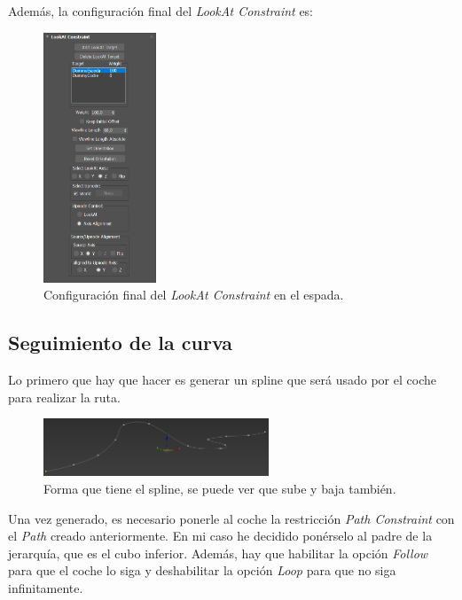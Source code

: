 Además, la configuración final del \textit{LookAt Constraint} es:

\begin{figure}[H]
    \centering
   \includegraphics[width=0.3\textwidth]{imagenes/espada/lookatconfig.png}
   \caption{Configuración final del \textit{LookAt Constraint} en el espada.}
\end{figure}

\subsection{Seguimiento de la curva}

Lo primero que hay que hacer es generar un spline que será usado por el coche para realizar la ruta.

\begin{figure}[H]
    \centering
   \includegraphics[width=0.6\textwidth]{imagenes/spline/spline.png}
   \caption{Forma que tiene el spline, se puede ver que sube y baja también.}
\end{figure}

Una vez generado, es necesario ponerle al coche la restricción \textit{Path Constraint} con el \textit{Path} creado anteriormente. En mi caso he decidido ponérselo al padre de la jerarquía, que es el cubo inferior. Además, hay que habilitar la opción \textit{Follow} para que el coche lo siga y deshabilitar la opción \textit{Loop} para que no siga infinitamente.

